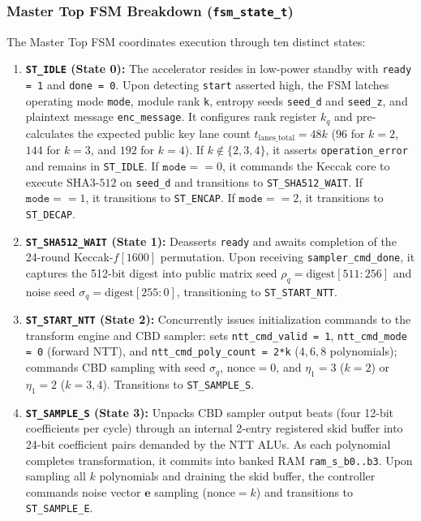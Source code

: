 \subsubsection{Master Top FSM Breakdown (\texttt{fsm\_state\_t})}
The Master Top FSM coordinates execution through ten distinct states:
\begin{enumerate}
    \item \textbf{\texttt{ST\_IDLE} (State 0):} The accelerator resides in low-power standby with \texttt{ready = 1} and \texttt{done = 0}. Upon detecting \texttt{start} asserted high, the FSM latches operating mode \texttt{mode}, module rank \texttt{k}, entropy seeds \texttt{seed\_d} and \texttt{seed\_z}, and plaintext message \texttt{enc\_message}. It configures rank register $k_q$ and pre-calculates the expected public key lane count $t_{\text{lanes\_total}} = 48k$ ($96$ for $k=2$, $144$ for $k=3$, and $192$ for $k=4$). If $k \notin \{2, 3, 4\}$, it asserts \texttt{operation\_error} and remains in \texttt{ST\_IDLE}. If $\texttt{mode} == 0$, it commands the Keccak core to execute $\text{SHA3-512}$ on \texttt{seed\_d} and transitions to \texttt{ST\_SHA512\_WAIT}. If $\texttt{mode} == 1$, it transitions to \texttt{ST\_ENCAP}. If $\texttt{mode} == 2$, it transitions to \texttt{ST\_DECAP}.
    \item \textbf{\texttt{ST\_SHA512\_WAIT} (State 1):} Deasserts \texttt{ready} and awaits completion of the 24-round Keccak-$f[1600]$ permutation. Upon receiving \texttt{sampler\_cmd\_done}, it captures the 512-bit digest into public matrix seed $\rho_q = \text{digest}[511:256]$ and noise seed $\sigma_q = \text{digest}[255:0]$, transitioning to \texttt{ST\_START\_NTT}.
    \item \textbf{\texttt{ST\_START\_NTT} (State 2):} Concurrently issues initialization commands to the transform engine and CBD sampler: sets \texttt{ntt\_cmd\_valid = 1}, \texttt{ntt\_cmd\_mode = 0} (forward NTT), and \texttt{ntt\_cmd\_poly\_count = 2*k} ($4, 6, 8$ polynomials); commands CBD sampling with seed $\sigma_q$, $\text{nonce} = 0$, and $\eta_1 = 3$ ($k=2$) or $\eta_1 = 2$ ($k=3, 4$). Transitions to \texttt{ST\_SAMPLE\_S}.
    \item \textbf{\texttt{ST\_SAMPLE\_S} (State 3):} Unpacks CBD sampler output beats (four 12-bit coefficients per cycle) through an internal 2-entry registered skid buffer into 24-bit coefficient pairs demanded by the NTT ALUs. As each polynomial completes transformation, it commits into banked RAM \texttt{ram\_s\_b0..b3}. Upon sampling all $k$ polynomials and draining the skid buffer, the controller commands noise vector $\mathbf{e}$ sampling ($\text{nonce} = k$) and transitions to \texttt{ST\_SAMPLE\_E}.

\end{enumerate}
